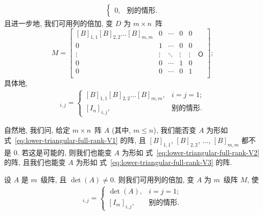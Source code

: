 \documentclass[../libro.tex]{subfiles}
\begin{document}
\begin{theorem}
\begin{align*}
\begin{cases}
            0,         & \text{别的情形}.
        \end{cases}
    \end{align*}
    且进一步地, 我们可用列的倍加,
    变 \(D\) 为 \(m \times n\)~阵
    \begin{equation}
        M =
        \begin{bmatrix}
            [B]_{1,1} [B]_{2,2} \dots [B]_{m,m} & 0      & \cdots & 0      & 0      & {}         \\
            0                                   & 1      & \cdots & 0      & 0      & {}         \\
            \vdots                              & \vdots & \ddots & \vdots & \vdots & \mathsf{O} \\
            0                                   & 0      & \cdots & 1      & 0      & {}         \\
            0                                   & 0      & \cdots & 0      & 1      & {}         \\
        \end{bmatrix};
        \label{eq:lower-triangular-full-rank-V3}
    \end{equation}
    具体地,
    \begin{align*}
        [M]_{i,j} =
        \begin{cases}
            [B]_{1,1} [B]_{2,2} \dots [B]_{m,m}, & i = j = 1;   \\
            [I_n]_{i,j},                         & \text{别的情形}.
        \end{cases}
    \end{align*}
\end{theorem}

自然地, 我们问, 给定 \(m \times n\)~阵 \(A\) (其中, \(m \leq n\)),
我们能否变 \(A\) 为形如%
式~\eqref{eq:lower-triangular-full-rank-V1} 的阵,
且 \([B]_{1,1}\), \([B]_{2,2}\), \(\dots\), \([B]_{m,m}\)
都不是 \(0\).
若这是可能的,
则我们也能变 \(A\) 为形如%
式~\eqref{eq:lower-triangular-full-rank-V2} 的阵,
且我们也能变 \(A\) 为形如%
式~\eqref{eq:lower-triangular-full-rank-V3} 的阵.

\begin{theorem}
    设 \(A\) 是 \(m\)~级阵,
    且 \(\det {(A)} \neq 0\).
    则我们可用列的倍加,
    变 \(A\) 为 \(m\)~级阵 \(M\),
    使
    \begin{align*}
        [M]_{i,j} =
        \begin{cases}
            \det {(A)},  & i = j = 1;   \\
            [I_m]_{i,j}, & \text{别的情形}.
        \end{cases}
    \end{align*}
\end{theorem}
\end{document}
